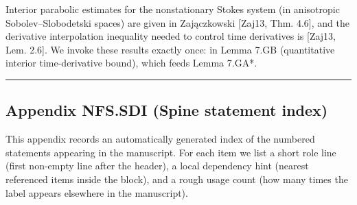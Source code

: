 \documentclass[
  11pt,
]{article}
\begin{document}
Interior parabolic estimates for the nonstationary Stokes system (in anisotropic Sobolev--Slobodetski spaces) are given in Zajączkowski {[}Zaj13, Thm. 4.6{]}, and the derivative interpolation inequality needed to control time derivatives is {[}Zaj13, Lem. 2.6{]}. We invoke these results exactly once: in Lemma 7.GB (quantitative interior time-derivative bound), which feeds Lemma 7.GA*.

\begin{center}\rule{0.5\linewidth}{0.5pt}\end{center}

\hypertarget{appendix-nfs.sdi-spine-statement-index}{%
\subsection{Appendix NFS.SDI (Spine statement index)}\label{appendix-nfs.sdi-spine-statement-index}}

This appendix records an automatically generated index of the numbered statements appearing in the manuscript. For each item we list a short role line (first non-empty line after the header), a local dependency hint (nearest referenced items inside the block), and a rough usage count (how many times the label appears elsewhere in the manuscript).
\end{document}
